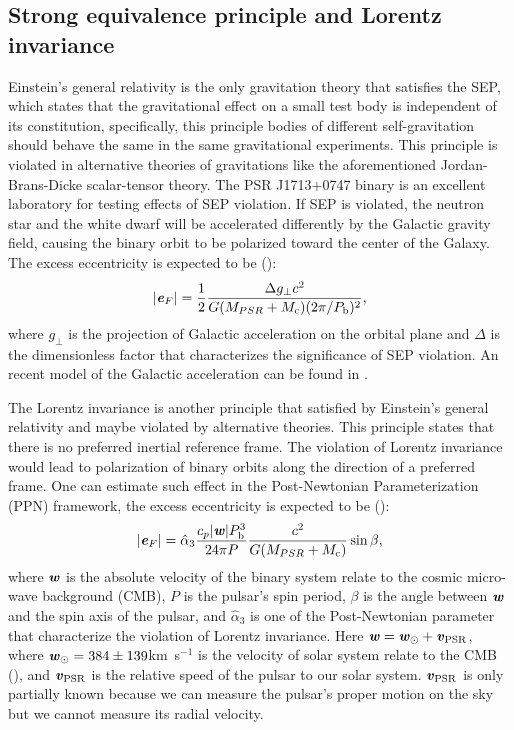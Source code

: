 \subsection{Strong equivalence principle and Lorentz invariance}
\label{sec:sep}
Einstein's general relativity is the only gravitation theory that satisfies
the SEP, which states that the gravitational
effect on a small test body is independent of its constitution, specifically,
this principle bodies of different self-gravitation should behave the same in
the same gravitational experiments. This principle is violated in alternative
theories of gravitations like the aforementioned Jordan-Brans-Dicke
scalar-tensor theory. The PSR J1713+0747 binary is an excellent laboratory for testing 
effects of SEP violation. If SEP is violated, the neutron star and the white
dwarf will be accelerated differently by the Galactic gravity field, causing
the binary orbit to be polarized toward the center of the Galaxy. The excess 
eccentricity is expected to be (\citealt{ds91}):
\begin{equation}
|\textbf{\textit{e}}_F| = \frac{1}{2}\frac{\Delta g_{\bot} c^2}{G(M_{PSR}+M_{\rm
c})(2\pi/P_{\rm b})^2},
\end{equation}
where $g_{\bot}$ is the projection of Galactic acceleration on the orbital plane 
and $\Delta$ is the dimensionless factor that characterizes the significance 
of SEP violation. An recent model of the Galactic acceleration can be found in
\citealt{hf04a}.

The Lorentz invariance is another principle that satisfied by Einstein's
general relativity and maybe violated by alternative theories. This principle
states that there is no preferred inertial reference frame. The violation of
Lorentz invariance would lead to polarization of binary orbits along the
direction of a preferred frame.
One can estimate such effect in the Post-Newtonian Parameterization
(PPN) framework, the excess eccentricity is expected to be (\citealt{bd97}):
\begin{equation}
|\textbf{\textit{e}}_F| = \hat{\alpha}_3 \frac{c_p|\textbf{\textit{w}}|P_{\rm b}^3}{24\pi P}
\frac{c^2}{G (M_{PSR}+M_{\rm c})}\sin \beta,
\end{equation}
where $\textbf{\textit{w}}$ is the absolute velocity of the binary system
relate to the cosmic micro-wave background (CMB), $P$ is the pulsar's spin period, $\beta$ is the
angle between $\textbf{\textit{w}}$ and the spin axis of the pulsar, and
$\hat{\alpha}_3$ is one of the Post-Newtonian parameter that characterize the
violation of Lorentz invariance. 
Here $\textbf{\textit{w}} = \textbf{\textit{w}}_{\odot} + \textbf{\textit{v}}_{\rm PSR}$, where
$\textbf{\textit{w}}_{\odot}=384\pm139$km~s$^{-1}$ is the velocity of solar system relate to the CMB (\citealt{aaa+13}),
and $\textbf{\textit{v}}_{\rm PSR}$ is the relative speed of the pulsar to our solar system. $\textbf{\textit{v}}_{\rm PSR}$ is only partially known because we can measure the pulsar's
proper motion on the sky but we cannot measure its radial velocity.

